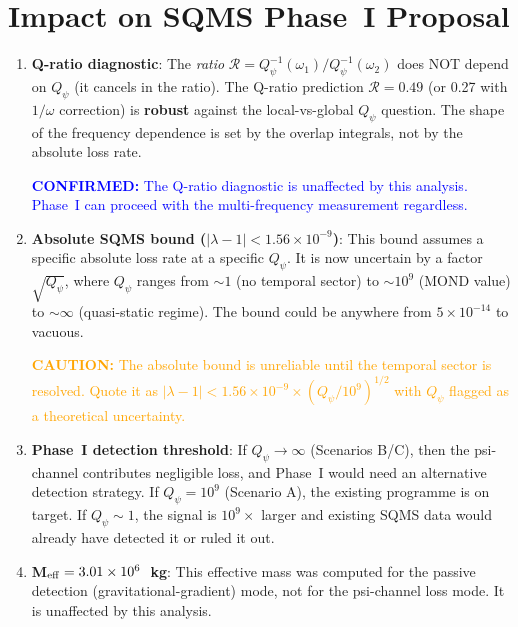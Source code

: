 \documentclass[11pt]{article}
\newcommand{\lbone}{|\lambda - 1|}
\newcommand{\Qpsi}{Q_\psi}
\newcommand{\ee}[1]{\times 10^{#1}}
\newcommand{\confirmed}[1]{\textcolor{blue}{\textbf{CONFIRMED:} #1}}
\newcommand{\caution}[1]{\textcolor{orange}{\textbf{CAUTION:} #1}}
\theoremstyle{definition}
\theoremstyle{remark}
\begin{document}
\section{Impact on SQMS Phase~I Proposal}
\label{sec:phase1}

\begin{tcolorbox}[colback=yellow!5!white, colframe=orange!60!black,
  title=\textbf{IMPACT ASSESSMENT}]

\begin{enumerate}
\item \textbf{Q-ratio diagnostic}: The \emph{ratio} $\mathcal{R} =
  Q_\psi^{-1}(\omega_1)/Q_\psi^{-1}(\omega_2)$ does NOT depend on
  $\Qpsi$ (it cancels in the ratio). The Q-ratio prediction
  $\mathcal{R} = 0.49$ (or 0.27 with $1/\omega$ correction) is
  \textbf{robust} against the local-vs-global $\Qpsi$ question.
  The shape of the frequency dependence is set by the overlap
  integrals, not by the absolute loss rate.

  \confirmed{The Q-ratio diagnostic is unaffected by this analysis.
  Phase~I can proceed with the multi-frequency measurement regardless.}

\item \textbf{Absolute SQMS bound ($\lbone < 1.56\ee{-9}$)}: This
  bound assumes a specific absolute loss rate at a specific $\Qpsi$.
  It is now uncertain by a factor $\sqrt{\Qpsi}$, where $\Qpsi$
  ranges from $\sim 1$ (no temporal sector) to $\sim 10^9$ (MOND
  value) to $\sim \infty$ (quasi-static regime). The bound could
  be anywhere from $5\ee{-14}$ to vacuous.

  \caution{The absolute bound is unreliable until the temporal sector
  is resolved. Quote it as $\lbone < 1.56\ee{-9}\times
  (\Qpsi/10^9)^{1/2}$ with $\Qpsi$ flagged as a theoretical
  uncertainty.}

\item \textbf{Phase~I detection threshold}: If $\Qpsi \to \infty$
  (Scenarios B/C), then the psi-channel contributes negligible loss,
  and Phase~I would need an alternative detection strategy. If
  $\Qpsi = 10^9$ (Scenario A), the existing programme is on target.
  If $\Qpsi \sim 1$, the signal is $10^9\times$ larger and existing
  SQMS data would already have detected it or ruled it out.

\item \textbf{M$_{\rm eff} = 3.01\ee{6}$~kg}: This effective mass
  was computed for the passive detection (gravitational-gradient)
  mode, not for the psi-channel loss mode. It is unaffected by
  this analysis.


\end{enumerate}
\end{tcolorbox}
\end{document}
